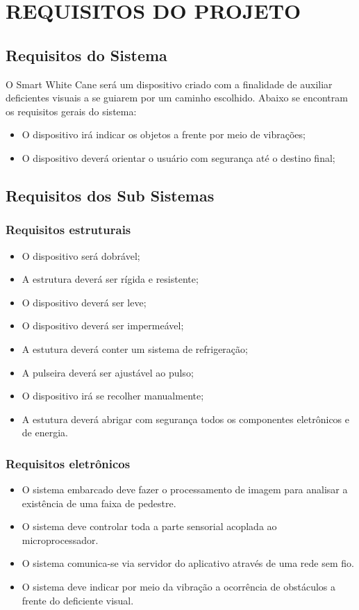 \chapter[Requisitos do projeto]{REQUISITOS DO PROJETO}

\section{Requisitos do Sistema}

O Smart White Cane será um dispositivo criado com a finalidade de auxiliar deficientes visuais a se guiarem por um caminho escolhido. Abaixo se encontram os requisitos gerais do sistema:

\begin{itemize}
\item O dispositivo irá indicar os objetos a frente por meio de vibrações;
\item O dispositivo deverá orientar o usuário com segurança até o destino final;
\end{itemize}

\section{Requisitos dos Sub Sistemas}

\subsection{Requisitos estruturais}

\begin{itemize}
\item O dispositivo será dobrável; 
\item A estrutura deverá ser rígida e resistente;
\item O dispositivo deverá ser leve;
\item O dispositivo deverá ser impermeável;
\item A estutura deverá conter um sistema de refrigeração; 
\item A pulseira deverá ser ajustável ao pulso;
\item O dispositivo irá se recolher manualmente;
\item A estutura deverá abrigar com segurança todos os componentes eletrônicos e de energia.
\end{itemize}

\subsection{Requisitos eletrônicos}
\begin{itemize}
\item O sistema embarcado deve fazer o processamento de imagem para analisar a existência de uma faixa de pedestre.
\item O sistema deve controlar toda a parte sensorial acoplada ao microprocessador.
\item O sistema comunica-se via servidor do aplicativo através de uma rede sem fio.
\item O sistema deve indicar por meio da vibração a ocorrência de obstáculos a frente do deficiente visual.
\end{itemize}
